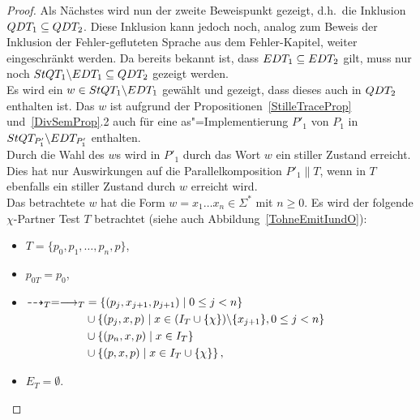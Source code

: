\begin{proof}
  Als Nächstes wird nun der zweite Beweispunkt gezeigt, d.h.\ die Inklusion
  $QDT _1\subseteq QDT _2$. Diese Inklusion kann jedoch noch, analog zum
  Beweis der Inklusion der Fehler-gefluteten Sprache aus dem Fehler-Kapitel,
  weiter eingeschränkt werden. Da bereits bekannt ist, dass $EDT _1 \subseteq
  EDT _2$ gilt, muss nur noch $StQT _1\backslash EDT _1\subseteq QDT _2$
  gezeigt werden.\\
  Es wird ein $w\in StQT _1\backslash EDT _1$ gewählt und gezeigt, dass dieses
  auch in $QDT _2$ enthalten ist. Das $w$ ist aufgrund der
  Propositionen~\ref{StilleTraceProp} und~\ref{DivSemProp}.2 auch für eine
  as"=Implementierung $P'_1$ von $P_1$ in $StQT _{P'_1}\backslash EDT
  _{P'_1}$ enthalten.\\
  Durch die Wahl des $w$s wird in $P'_1$ durch das Wort $w$ ein stiller
  Zustand erreicht. Dies hat nur Auswirkungen auf die Parallelkomposition
  $P'_1\|T$, wenn in $T$ ebenfalls ein stiller Zustand durch $w$ erreicht
  wird.\\
  Das betrachtete $w$ hat die Form $w = x_1\dots x_n\in\Sigma ^*$ mit $n\geq
  0$. Es wird der folgende $\chi$-Partner Test $T$ betrachtet (siehe auch
  Abbildung~\ref{TohneEmitIundO}):
  \begin{itemize}
    \item $T=\{p_0,p_1,\dots ,p_n, p\}$,
    \item $p_{0T}=p_0$,
    \item $\begin{aligned}[t]
        \may _T = \must _T &= \left\{(p_j,x_{j+1},p_{j+1})\mid  0\leq j<
        n\right\}\\
        &\cup\left\{(p_j,x,p)\mid  x\in (I_T\cup
        \{\chi\})\backslash\{x_{j+1}\}, 0\leq j< n\right\}\\
        &\cup\left\{(p_n,x,p)\mid x\in I_T\right\}\\
        &\cup\left\{(p,x,p)\mid x\in I_T\cup\{\chi\}\right\},
    \end{aligned}$
    \item $E_T=\emptyset$.
  \end{itemize}
  \begin{figure} [h!tbp]
  \begin{center}
\end{center}
\end{figure}
\end{proof}
